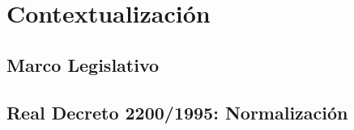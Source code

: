 \chapter{Contextualización}

\section{Marco Legislativo}

\section{Real Decreto 2200/1995: Normalización}

